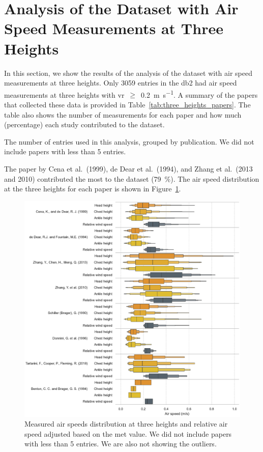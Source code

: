 \appendix

\section{Analysis of the Dataset with Air Speed Measurements at Three Heights}\label{sec:analysis-of-the-dataset-with-air-speed-measurements-at-three-heights}

In this section, we show the results of the analysis of the dataset with air speed measurements at three heights.
Only \num{3059} entries in the \ac{db2} had air speed measurements at three heights with \ac{vr}~$\geq$~\qty{0.2}{\m\per\s}.
A summary of the papers that collected these data is provided in Table~\ref{tab:three_heights_papers}.
The table also shows the number of measurements for each paper and how much (percentage) each study contributed to the dataset.
\begin{table}[htb!]
    \centering
    
    \caption{The number of entries used in this analysis, grouped by publication.
    We did not include papers with less than \num{5} entries.}
    \label{tab:three_heights_papers}
\end{table}
The paper by Cena et al.\ (1999), de Dear et al.\ (1994), and Zhang et al.\ (2013 and 2010) contributed the most to the dataset (\qty{79}{\percent}).
The air speed distribution at the three heights for each paper is shown in Figure~\ref{fig:boxenplot_wind_speed_three_heights}.
\begin{figure}[htb!]
    \centering
    \includegraphics[width=\textwidth]{figures/boxenplot_wind_speed_three_heights}
    \caption{Measured air speeds distribution at three heights and relative air speed adjusted based on the \ac{met} value.
    We did not include papers with less than \num{5} entries.
    We are also not showing the outliers.}
    \label{fig:boxenplot_wind_speed_three_heights}
\end{figure}
